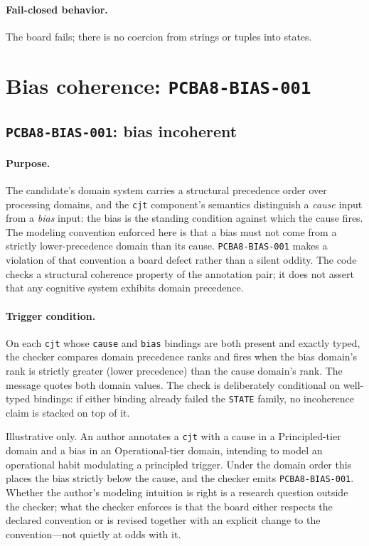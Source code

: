 \paragraph{Fail-closed behavior.} The board fails; there is no coercion from strings or tuples into states.

\section{Bias coherence: \texttt{PCBA8-BIAS-001}}\label{ch07:sec:bias}

\subsection{\texttt{PCBA8-BIAS-001}: bias incoherent}\label{ch07:sub:bias001}

\paragraph{Purpose.} The candidate's domain system carries a structural precedence order over processing domains, and the \texttt{cjt} component's semantics distinguish a \emph{cause} input from a \emph{bias} input: the bias is the standing condition against which the cause fires. The modeling convention enforced here is that a bias must not come from a strictly lower-precedence domain than its cause. \texttt{PCBA8-BIAS-001} makes a violation of that convention a board defect rather than a silent oddity. The code checks a structural coherence property of the annotation pair; it does not assert that any cognitive system exhibits domain precedence.

\paragraph{Trigger condition.} On each \texttt{cjt} whose \texttt{cause} and \texttt{bias} bindings are both present and exactly typed, the checker compares domain precedence ranks and fires when the bias domain's rank is strictly greater (lower precedence) than the cause domain's rank. The message quotes both domain values. The check is deliberately conditional on well-typed bindings: if either binding already failed the \texttt{STATE} family, no incoherence claim is stacked on top of it.

\begin{example}\label{ch07:ex:bias001}
Illustrative only. An author annotates a \texttt{cjt} with a cause in a Principled-tier domain and a bias in an Operational-tier domain, intending to model an operational habit modulating a principled trigger. Under the domain order this places the bias strictly below the cause, and the checker emits \texttt{PCBA8-BIAS-001}. Whether the author's modeling intuition is right is a research question outside the checker; what the checker enforces is that the board either respects the declared convention or is revised together with an explicit change to the convention---not quietly at odds with it.
\end{example}

